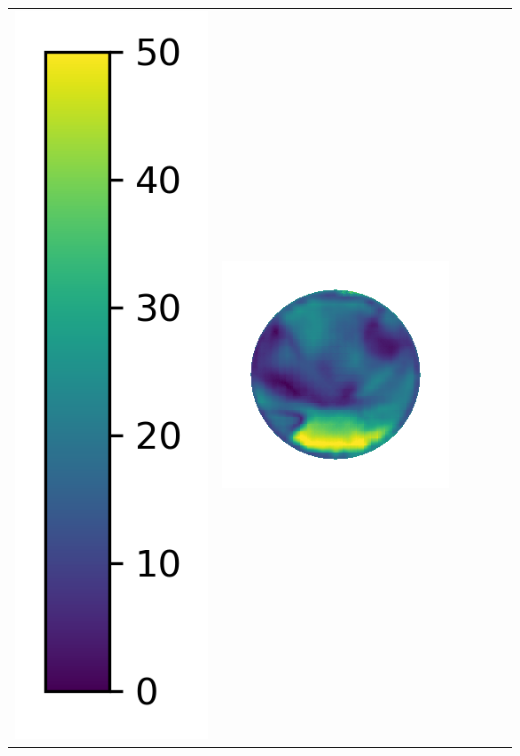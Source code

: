 \begin{center}
\begin{tabularx}{\linewidth}{@{}Y@{}Y@{}Y@{}Y@{}Y@{}Y@{}}
\includegraphics[width=0.2\linewidth]{semisynthetic/colorbar_error_vertical.png} &
\includegraphics[width=\linewidth]{semisynthetic/20160617_13_ours_err.png} &

\end{tabularx}
\end{center}
